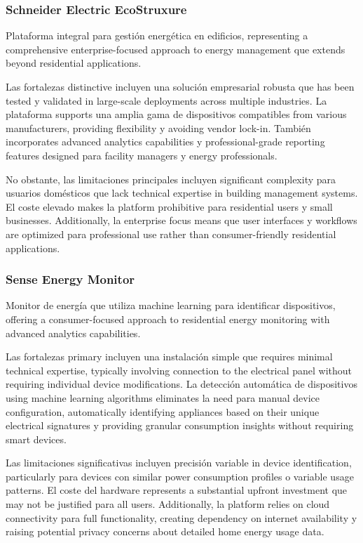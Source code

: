 \subsubsection{Schneider Electric EcoStruxure}

Plataforma integral para gestión energética en edificios, representing a comprehensive enterprise-focused approach to energy management que extends beyond residential applications.

Las fortalezas distinctive incluyen una solución empresarial robusta que has been tested y validated in large-scale deployments across multiple industries. La plataforma supports una amplia gama de dispositivos compatibles from various manufacturers, providing flexibility y avoiding vendor lock-in. También incorporates advanced analytics capabilities y professional-grade reporting features designed para facility managers y energy professionals.

No obstante, las limitaciones principales incluyen significant complexity para usuarios domésticos que lack technical expertise in building management systems. El coste elevado makes la platform prohibitive para residential users y small businesses. Additionally, la enterprise focus means que user interfaces y workflows are optimized para professional use rather than consumer-friendly residential applications.

\subsubsection{Sense Energy Monitor}

Monitor de energía que utiliza machine learning para identificar dispositivos, offering a consumer-focused approach to residential energy monitoring with advanced analytics capabilities.

Las fortalezas primary incluyen una instalación simple que requires minimal technical expertise, typically involving connection to the electrical panel without requiring individual device modifications. La detección automática de dispositivos using machine learning algorithms eliminates la need para manual device configuration, automatically identifying appliances based on their unique electrical signatures y providing granular consumption insights without requiring smart devices.

Las limitaciones significativas incluyen precisión variable in device identification, particularly para devices con similar power consumption profiles o variable usage patterns. El coste del hardware represents a substantial upfront investment que may not be justified para all users. Additionally, la platform relies on cloud connectivity para full functionality, creating dependency on internet availability y raising potential privacy concerns about detailed home energy usage data.

